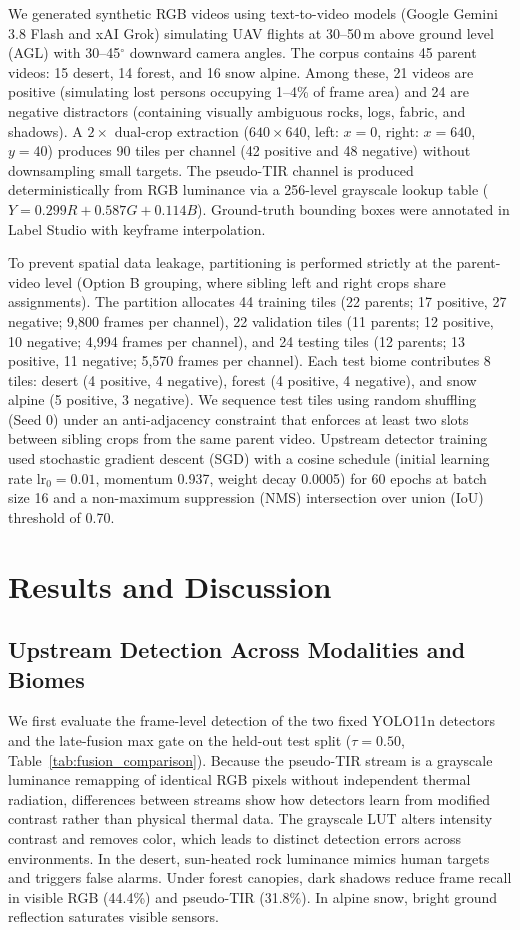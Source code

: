 \documentclass[conference]{IEEEtran}
\begin{document}
We generated synthetic RGB videos using text-to-video models (Google Gemini 3.8 Flash and xAI Grok) simulating UAV flights at 30--50\,m above ground level (AGL) with 30--45$^\circ$ downward camera angles. The corpus contains 45 parent videos: 15 desert, 14 forest, and 16 snow alpine. Among these, 21 videos are positive (simulating lost persons occupying 1--4\% of frame area) and 24 are negative distractors (containing visually ambiguous rocks, logs, fabric, and shadows). A $2\times$ dual-crop extraction ($640 \times 640$, left: $x=0$, right: $x=640$, $y=40$) produces 90 tiles per channel (42 positive and 48 negative) without downsampling small targets. The pseudo-TIR channel is produced deterministically from RGB luminance via a 256-level grayscale lookup table ($Y = 0.299R + 0.587G + 0.114B$). Ground-truth bounding boxes were annotated in Label Studio with keyframe interpolation.

To prevent spatial data leakage, partitioning is performed strictly at the parent-video level (Option B grouping, where sibling left and right crops share assignments). The partition allocates 44 training tiles (22 parents; 17 positive, 27 negative; 9,800 frames per channel), 22 validation tiles (11 parents; 12 positive, 10 negative; 4,994 frames per channel), and 24 testing tiles (12 parents; 13 positive, 11 negative; 5,570 frames per channel). Each test biome contributes 8 tiles: desert (4 positive, 4 negative), forest (4 positive, 4 negative), and snow alpine (5 positive, 3 negative). We sequence test tiles using random shuffling (Seed 0) under an anti-adjacency constraint that enforces at least two slots between sibling crops from the same parent video. Upstream detector training used stochastic gradient descent (SGD) with a cosine schedule (initial learning rate $\text{lr}_0=0.01$, momentum 0.937, weight decay 0.0005) for 60 epochs at batch size 16 and a non-maximum suppression (NMS) intersection over union (IoU) threshold of 0.70.

\section{Results and Discussion}

\subsection{Upstream Detection Across Modalities and Biomes}
We first evaluate the frame-level detection of the two fixed YOLO11n detectors and the late-fusion max gate on the held-out test split ($\tau = 0.50$, Table~\ref{tab:fusion_comparison}). Because the pseudo-TIR stream is a grayscale luminance remapping of identical RGB pixels without independent thermal radiation, differences between streams show how detectors learn from modified contrast rather than physical thermal data. The grayscale LUT alters intensity contrast and removes color, which leads to distinct detection errors across environments. In the desert, sun-heated rock luminance mimics human targets and triggers false alarms. Under forest canopies, dark shadows reduce frame recall in visible RGB (44.4\%) and pseudo-TIR (31.8\%). In alpine snow, bright ground reflection saturates visible sensors.
\end{document}
